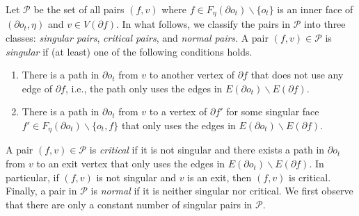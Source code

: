 \documentclass[a4paper,11pt]{article}
\numberwithin{lemma}{section}
\begin{document}
Let $\mathcal{P}$ be the set of all pairs $(f,v)$ where $f \in F_\eta(\partial o_t) \backslash \{o_t\}$ is an inner face of $(\partial o_t, \eta)$ and $v \in V(\partial f)$.
In what follows, we classify the pairs in $\mathcal{P}$ into three classes: \textit{singular pairs}, \textit{critical pairs}, and \textit{normal pairs}.
A pair $(f,v) \in \mathcal{P}$ is \textit{singular} if (at least) one of the following conditions holds.
\begin{enumerate}[label = (\roman*)]
 \item There is a path in $\partial o_t$ from $v$ to another vertex of $\partial f$ that does not use any edge of $\partial f$, i.e., the path only uses the edges in $E(\partial o_t) \backslash E(\partial f)$.
 \item There is a path in $\partial o_t$ from $v$ to a vertex of $\partial f'$ for some singular face $f' \in F_\eta(\partial o_t) \backslash \{o_t,f\}$ that only uses the edges in $E(\partial o_t) \backslash E(\partial f)$.
\end{enumerate}
A pair $(f,v) \in \mathcal{P}$ is \textit{critical} if it is not singular and there exists a path in $\partial o_t$ from $v$ to an exit vertex that only uses the edges in $E(\partial o_t) \backslash E(\partial f)$.
In particular, if $(f,v)$ is not singular and $v$ is an exit, then $(f,v)$ is critical.
Finally, a pair in $\mathcal{P}$ is \textit{normal} if it is neither singular nor critical.
We first observe that there are only a constant number of singular pairs in $\mathcal{P}$.
\end{document}
